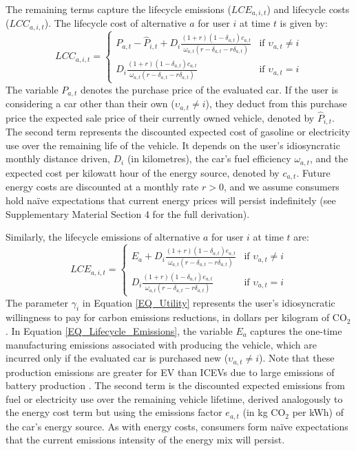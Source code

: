 \documentclass[12pt]{article}
\begin{document}
The remaining terms capture the lifecycle emissions ($LCE_{a,i,t}$) and lifecycle costs ($LCC_{a,i,t}$). The lifecycle cost of alternative $a$ for user $i$ at time $t$ is given by:
\begin{equation}
    LCC_{a,i,t} =
    \begin{cases}
        P_{a,t} - \hat{P}_{i,t} + D_i\frac{(1+r)(1-\delta_{a,t})c_{a,t}}{\omega_{a,t}(r-\delta_{a,t}-r\delta_{a,t})}
            & \text{if } \upsilon_{a,t} \neq i \\[12pt]
        D_i\frac{(1+r)(1-\delta_{a,t})c_{a,t}}{\omega_{a,t}(r-\delta_{a,t}-r\delta_{a,t})}
            & \text{if } \upsilon_{a,t} = i
    \end{cases}
    \label{EQ_Lifecycle_Cost}
\end{equation}
The variable $P_{a,t}$ denotes the purchase price of the evaluated car. If the user is considering a car other than their own ($\upsilon_{a,t} \neq i$), they deduct from this purchase price the expected sale price of their currently owned vehicle, denoted by $\hat{P}_{i,t}$. The second term represents the discounted expected cost of gasoline or electricity use over the remaining life of the vehicle. It depends on the user's
idiosyncratic monthly distance driven, $D_i$ (in kilometres), the car's fuel efficiency $\omega_{a,t}$, and the expected cost per kilowatt hour of the energy source, denoted by $c_{a,t}$. Future energy costs are discounted at a monthly rate $r>0$, and we assume consumers hold naïve expectations that current energy prices will persist indefinitely (see Supplementary Material Section 4 for the full derivation).

Similarly, the lifecycle emissions of alternative $a$ for user $i$ at time $t$ are:
\begin{equation}
    LCE_{a,i,t} =
    \begin{cases}
        E_{a} + D_i\frac{(1+r)(1-\delta_{a,t})e_{a,t}}{\omega_{a,t}(r-\delta_{a,t}-r\delta_{a,t})}
            & \text{if } \upsilon_{a,t} \neq i \\[12pt]
        D_i\frac{(1+r)(1-\delta_{a,t})e_{a,t}}{\omega_{a,t}(r-\delta_{a,t}-r\delta_{a,t})}
            & \text{if } \upsilon_{a,t} = i
    \end{cases}
    \label{EQ_Lifecycle_Emissions}
\end{equation}
The parameter $\gamma_i$ in Equation \ref{EQ_Utility} represents the user's idiosyncratic willingness to pay for carbon emissions reductions, in dollars per kilogram of CO$_2$. In Equation \ref{EQ_Lifecycle_Emissions}, the variable $E_{a}$ captures the one-time manufacturing emissions associated with producing the vehicle, which are incurred only if the evaluated car is purchased new ($\upsilon_{a,t} \neq i$). Note that these production emissions are greater for EV than ICEVs due to large emissions of battery production \citep{konig2021overview}. The second term is the discounted expected emissions from fuel or electricity use over the remaining vehicle lifetime, derived analogously to the energy cost term but using the emissions factor $e_{a,t}$ (in kg CO$_2$ per kWh) of the car's energy source. As with energy costs, consumers form naïve expectations that the current emissions intensity of the energy mix will persist.
\end{document}
